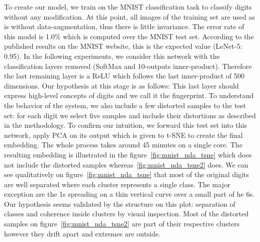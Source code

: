 \documentclass[a4paper,12pt]{report}
\begin{document}
To create our model, we train on the MNIST classification task to classify digits without any modification.
At this point, all images of the training set are used as is without data-augmentation, thus there is little invariance.
The error rate of this model is 1.0\% which is computed over the MNIST test set.
According to the published results on the MNIST website, this is the expected value (LeNet-5: 0.95)\cite{mnist_web}.
In the following experiments, we consider this network with the classification layers removed (SoftMax and 10-outputs inner-product).
Therefore the last remaining layer is a ReLU which follows the last inner-product of 500 dimensions.
Our hypothesis at this stage is as follows: This last layer should express high-level concepts of digits and we call it the fingerprint.
To understand the behavior of the system, we also include a few distorted samples to the test set: for each digit we select five samples and include their distortions as described in the methodology.
To confirm our intuition, we forward this test set into this network, apply PCA on its output which is given to t-SNE to create the final embedding.
The whole process takes around 45 minutes on a single core.
The resulting embedding is illustrated in the figure~\ref{fig:mnist_nda_tsne} which does not include the distorted samples whereas~\ref{fig:mnist_nda_tsne2} does.
We can see qualitatively on figure~\ref{fig:mnist_nda_tsne} that most of the original digits are well separated where each cluster represents a single class.
The major exception are the 1s spreading on a thin vertical curve over a small part of he 6s.
Our hypothesis seems validated by the structure on this plot: separation of classes and coherence inside clusters by visual inspection.
Most of the distorted samples on figure~\ref{fig:mnist_nda_tsne2} are part of their respective clusters however they drift apart and extremes are outside.
\end{document}
